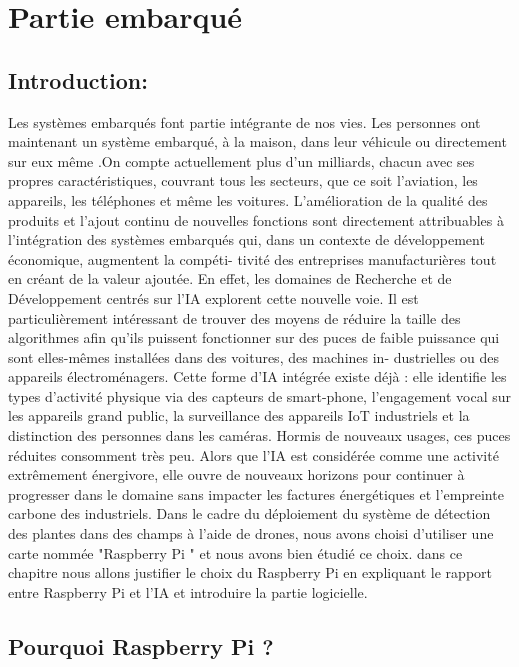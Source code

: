 \chapter{Partie embarqué}
\section{Introduction:}
Les systèmes embarqués font partie intégrante de nos vies. Les personnes ont maintenant un système embarqué, à la maison, dans leur véhicule ou directement sur eux même .On compte actuellement plus d'un milliards, chacun avec ses propres caractéristiques, couvrant tous les secteurs,
que ce soit l'aviation, les appareils, les téléphones et même les voitures. L'amélioration de la qualité
des produits et l'ajout continu de nouvelles fonctions sont directement attribuables à l'intégration des
systèmes embarqués qui, dans un contexte de développement économique, augmentent la compéti-
tivité des entreprises manufacturières tout en créant de la valeur ajoutée. En effet, les domaines de
Recherche et de Développement centrés sur l'IA explorent cette nouvelle voie. Il est particulièrement
intéressant de trouver des moyens de réduire la taille des algorithmes afin qu'ils puissent fonctionner
sur des puces de faible puissance qui sont elles-mêmes installées dans des voitures, des machines in-
dustrielles ou des appareils électroménagers. Cette forme d'IA intégrée existe déjà : elle identifie les
types d'activité physique via des capteurs de smart-phone, l'engagement vocal sur les appareils grand
public, la surveillance des appareils IoT industriels et la distinction des personnes dans les caméras.
Hormis de nouveaux usages, ces puces réduites consomment très peu. Alors que l'IA est considérée
comme une activité extrêmement énergivore, elle ouvre de nouveaux horizons pour continuer à progresser dans le domaine sans impacter les factures énergétiques et l'empreinte carbone des industriels.
\newline
Dans le cadre du déploiement du système de détection des plantes dans des champs à l'aide de drones,
nous avons choisi d'utiliser une carte nommée "Raspberry Pi " et nous avons bien étudié ce choix.
\newline
dans ce chapitre nous allons justifier le choix du Raspberry Pi en expliquant le rapport entre Raspberry Pi et l'IA et introduire la partie logicielle.
\section{Pourquoi  Raspberry Pi ? }
